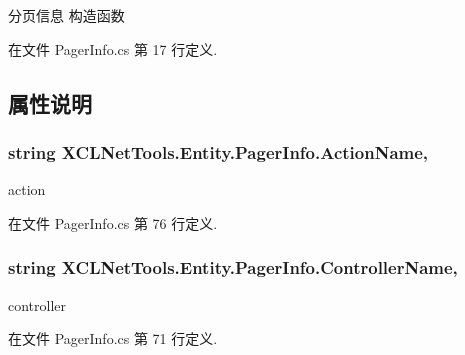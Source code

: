 分页信息 构造函数 



在文件 Pager\-Info.\-cs 第 17 行定义.



\subsection{属性说明}
\hypertarget{class_x_c_l_net_tools_1_1_entity_1_1_pager_info_aa3c26ca4634e5ab5023cc0157e3245b7}{
\subsubsection[{Action\-Name}]{\setlength{\rightskip}{0pt plus 5cm}string X\-C\-L\-Net\-Tools.\-Entity.\-Pager\-Info.\-Action\-Name\hspace{0.3cm}{\ttfamily [get]}, {\ttfamily [set]}}}\label{class_x_c_l_net_tools_1_1_entity_1_1_pager_info_aa3c26ca4634e5ab5023cc0157e3245b7}


action 



在文件 Pager\-Info.\-cs 第 76 行定义.

\hypertarget{class_x_c_l_net_tools_1_1_entity_1_1_pager_info_a7684b1dd21faadcf80c1e2d081660569}{
\subsubsection[{Controller\-Name}]{\setlength{\rightskip}{0pt plus 5cm}string X\-C\-L\-Net\-Tools.\-Entity.\-Pager\-Info.\-Controller\-Name\hspace{0.3cm}{\ttfamily [get]}, {\ttfamily [set]}}}\label{class_x_c_l_net_tools_1_1_entity_1_1_pager_info_a7684b1dd21faadcf80c1e2d081660569}


controller 



在文件 Pager\-Info.\-cs 第 71 行定义.

